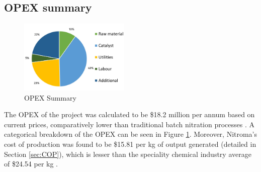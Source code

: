 \subsection{OPEX summary}

\begin{figure}
    \vspace{-1.1cm}
    \label{fig:OPEXSummary}
    \includegraphics[width=0.47\textwidth]{chapters/6-economics/figures/OPEX_summary.jpg}
    \caption{OPEX Summary}
\end{figure}
The OPEX of the project was calculated to be \$18.2 million per annum based on current prices, comparatively lower than traditional batch nitration processes \cite{general_kinematics_how_2019}. A categorical breakdown of the OPEX can be seen in Figure \ref{fig:OPEXSummary}. Moreover, Nitroma's cost of production was found to be \$15.81 per kg of output generated (detailed in Section \ref{sec:COP}), which is lesser than the speciality chemical industry average of \$24.54 per kg \cite{maroulis_cumulative_2017}.